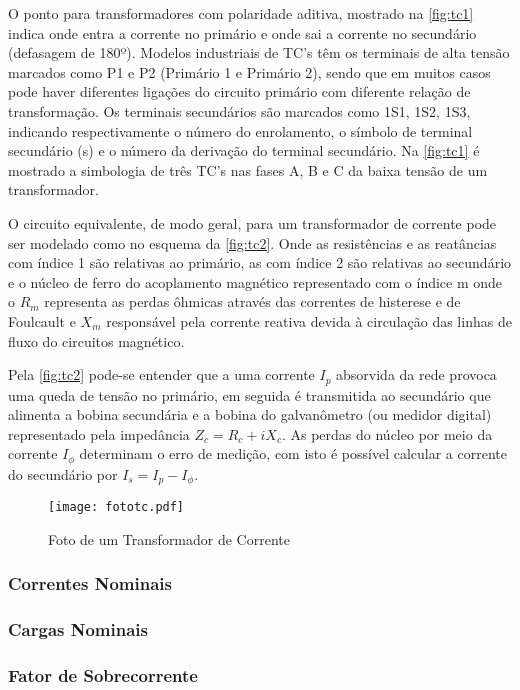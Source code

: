			O ponto para transformadores com polaridade aditiva, mostrado na \autoref{fig:tc1} indica onde entra a corrente no primário e onde sai a corrente no secundário (defasagem de 180º). Modelos industriais de TC’s têm os terminais de alta tensão marcados como P1 e P2 (Primário 1 e Primário 2), sendo que em muitos casos pode haver diferentes ligações do circuito primário com diferente relação de transformação. Os terminais secundários são marcados como 1S1, 1S2, 1S3, indicando respectivamente o número do enrolamento, o símbolo de terminal secundário (s) e o número da derivação do terminal secundário. Na \autoref{fig:tc1} é mostrado a simbologia de três TC's nas fases A, B e C da baixa tensão de um transformador.\par
			O circuito equivalente, de modo geral, para um transformador de corrente pode ser modelado como no esquema da \autoref{fig:tc2}. Onde as resistências e as reatâncias com índice 1 são relativas ao primário, as com índice 2 são relativas ao secundário e o núcleo de ferro do acoplamento magnético representado com o índice m onde o $R_m$ representa as perdas ôhmicas através das correntes de histerese e de Foulcault e $X_m$ responsável pela corrente reativa devida à circulação das linhas de fluxo do circuitos magnético. \cite{mamedemanual}\par
			Pela \autoref{fig:tc2} pode-se entender que a uma corrente $I_p$ absorvida da rede provoca uma queda de tensão no primário, em seguida é transmitida ao secundário que alimenta a bobina secundária e a bobina do galvanômetro (ou medidor digital) representado pela impedância $Z_c=R_c+iX_c$. As perdas do núcleo por meio da corrente $I_\phi$ determinam o erro de medição, com isto é possível calcular a corrente do secundário por $I_s=I_p-I_\phi$.\par
			\begin{figure}[htb]
				\caption{Foto de um Transformador de Corrente}
				\centering
				\texttt{[image: fototc.pdf]}
				\label{fig:fototc}
				\end{figure}
			\subsubsection{Correntes Nominais}
			\subsubsection{Cargas Nominais}			
			\subsubsection{Fator de Sobrecorrente}
